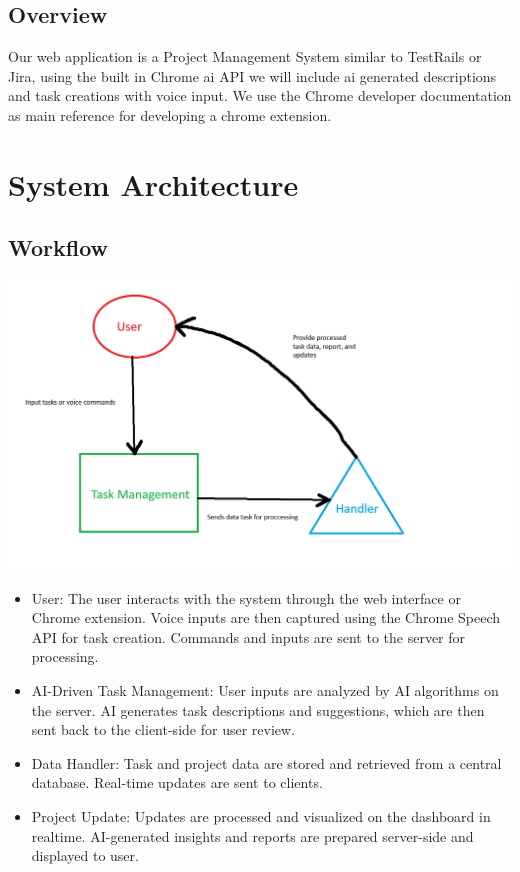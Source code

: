 \documentclass{article}
\begin{document}
\subsection{Overview}
Our web application is a Project Management System similar to TestRails or Jira, using the built in Chrome \Gls{ai} API we will include ai generated descriptions and task creations with voice input. We use the Chrome developer documentation\cite{dev} as main reference for developing a chrome extension.

\section{System Architecture}

\subsection{Workflow}

\includegraphics[width=0.9\linewidth]{../logo/workflow.png} 

\begin{itemize}
    \item User: The user interacts with the system through the web interface or Chrome extension. Voice inputs are then captured using the Chrome Speech API for task creation. Commands and inputs are sent to the server for processing.
    \item AI-Driven Task Management: User inputs are analyzed by AI algorithms on the server. AI generates task descriptions and suggestions, which are then sent back to the client-side for user review.
    \item Data Handler: Task and project data are stored and retrieved from a central database. Real-time updates are sent to clients.
    \item Project Update: Updates are processed and visualized on the dashboard in realtime. AI-generated insights and reports are prepared server-side and displayed to user.
\end{itemize}
\end{document}
